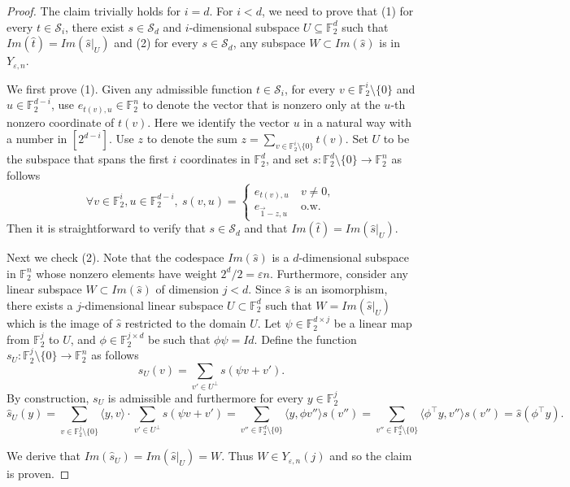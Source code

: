 \documentclass[10pt,a4paper]{article}
\theoremstyle{definition}
\theoremstyle{remark}
\newcommand{\set}[1]{\{#1\}}
\newcommand{\iprod}[1]{\langle#1\rangle}
\newcommand{\F}{\mathbb{F}}
\numberwithin{equation}{section}
\def\diml{d}
\begin{document}
\begin{proof}
The claim trivially holds for $i = d$. For $i < d$, we need to prove that (1) for every $t \in \mathcal{S}_i$, there exist $s\in \mathcal{S}_d$ and $i$-dimensional subspace $U \subseteq \F^d_2$ such that  $Im(\widehat{t})= Im(\widehat{s}|_U)$ and (2) for every $s\in \mathcal{S}_d$, any subspace $W \subset Im(\widehat{s})$ is in $Y_{\varepsilon,n}$.

We first prove (1). Given any admissible function $t\in \mathcal{S}_i$, for every $v\in \F_2^i\setminus\set{0}$ and $u\in\F_2^{d-i}$, use $e_{t(v),u}\in\F^n_2$ to denote the vector that is nonzero only at the $u$-th nonzero coordinate of $t(v)$. Here we identify the vector $u$ in a natural way with a number in $[2^{d-i}]$. Use $z$ to denote the sum $z = \sum_{v\in \F_2^i \setminus \set{0}} t(v)$. Set $U$ to be the subspace that spans the first $i$ coordinates in $\F_2^d$, and set $s:\F_2^d\setminus \set{0} \to  \F_2^n$ as follows 
\[\forall v\in \F_2^i, u \in \F_2^{d-i},~s(v,u)  = \begin{cases}
     e_{t(v),u} ~ &v\neq 0,\\
     e_{\Vec{1} - z, u} ~&\text{o.w.} 
\end{cases}\]
Then it is straightforward to verify that $s \in  \mathcal{S}_d$ and that $Im(\widehat{t})=Im(\widehat{s}|_U)$.

Next we check (2). Note that the codespace $Im(\widehat{s})$ is a $d$-dimensional subspace in $\F_2^n$ whose nonzero elements have weight $2^{\diml}/2 = \varepsilon n$. Furthermore, consider any linear subspace $W\subset Im(\widehat{s})$ of dimension $j<d$. Since $\widehat{s}$ is an isomorphism, there exists a $j$-dimensional linear subspace $U\subset \F_2^d$ such that $W = Im(\widehat{s}|_U)$ which is the image of $\widehat{s}$ restricted to the domain $U$. Let $\psi\in \F_2^{d\times j}$ be a linear map from $\F_2^j$ to $U$, and $\phi \in \F_2^{j\times d}$ be such that $\phi\psi = Id$. Define the function $s_U:\F_2^j\setminus\set{0} \to \F_2^n$ as follows
\[ s_U(v) = \sum_{v'\in U^{\perp}} s(\psi v+v').\]
By construction, $s_U$ is admissible and furthermore for every $y\in \F_2^j$ 
\[\widehat{s}_U(y) = \sum_{v \in \F_2^j\setminus \set{0}} \iprod{y,v}\cdot\sum_{v'\in U^{\perp}} s(\psi v+v') = \sum_{v''\in \F_2^d\setminus \set{0}} \iprod{y,\phi v''} s(v'') =\sum_{v''\in \F_2^d\setminus \set{0}} \iprod{\phi^\top y,v''} s(v'') =  \widehat{s}(\phi^\top y).\]

We derive that $Im(\widehat{s}_U) = Im(\widehat{s}|_U) = W$. Thus $W \in Y_{\varepsilon,n}(j)$ and so the claim is proven.
\end{proof}
\end{document}
